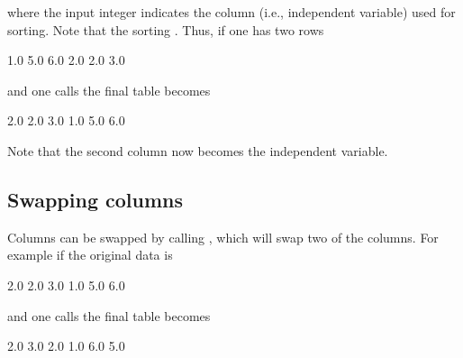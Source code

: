 \documentclass[letterpaper,10pt,english]{sphinxmanual}
\begin{document}
\begin{sphinxVerbatim}[commandchars=\\\{\},formatcom=\scriptsize]
  
   
\end{sphinxVerbatim}

\sphinxAtStartPar
where the input integer indicates the column (i.e., independent variable) used for sorting.
Note that the sorting .
Thus, if one has two rows

\begin{sphinxVerbatim}[commandchars=\\\{\},formatcom=\scriptsize]
1.0  5.0  6.0
2.0  2.0  3.0
\end{sphinxVerbatim}

\sphinxAtStartPar
and one calls  the final table becomes

\begin{sphinxVerbatim}[commandchars=\\\{\},formatcom=\scriptsize]
2.0  2.0  3.0
1.0  5.0  6.0
\end{sphinxVerbatim}

\sphinxAtStartPar
Note that the second column now becomes the independent variable.


\subsection{Swapping columns}
\label{\detokenize{Utilities/LookupTable:swapping-columns}}
\sphinxAtStartPar
Columns can be swapped by calling , which will swap two of the columns.
For example if the original data is

\begin{sphinxVerbatim}[commandchars=\\\{\},formatcom=\scriptsize]
2.0  2.0  3.0
1.0  5.0  6.0
\end{sphinxVerbatim}

\sphinxAtStartPar
and one calls  the final table becomes

\begin{sphinxVerbatim}[commandchars=\\\{\},formatcom=\scriptsize]
2.0  3.0  2.0
1.0  6.0  5.0
\end{sphinxVerbatim}
\end{document}
